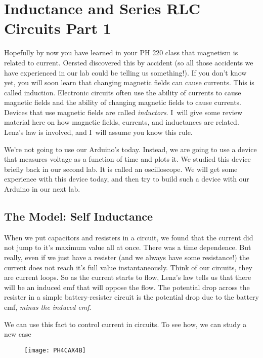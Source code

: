 \chapter{Inductance and Series RLC Circuits Part 1}
Hopefully by now you have learned in your PH 220 class that magnetism is related to current. Oersted discovered this by accident (so all those accidents we have experienced in our lab could be telling us something!). If you don't know yet, you will soon learn that changing magnetic fields can cause currents. This is called induction. Electronic circuits often use the ability of currents to cause magnetic fields and the ability of changing magnetic fields to cause currents. Devices that use magnetic fields are called \emph{inductors}. I\ will give some review material here on how magnetic fields, currents, and inductances are related. Lenz's law is involved, and I\ will assume you know this rule.

We're not going to use our Arduino's today. Instead, we are going to use a device that measures voltage as a function of time and plots it. We studied this device briefly back in our second lab. It is called an oscilloscope. We will get some experience with this device today, and then try to build such a device with our Arduino in our next lab.

\section{The Model: Self Inductance}

When we put capacitors and resisters in a circuit, we found that the current did not jump to it's maximum value all at once. There was a time dependence. But really, even if we just have a resister (and we always have some resistance!) the current does not reach it's full value instantaneously. Think of our circuits, they are current loops. So as the current starts to flow, Lenz's law tells us that there will be an induced emf that will oppose the flow. The potential drop across the resister in a simple battery-resister circuit is the potential drop due to the battery emf, \emph{minus the induced emf}.

We can use this fact to control current in circuits. To see how, we can study a new case

\begin{figure}[h!]
	\centering
	\texttt{[image: PH4CAX4B]}
\end{figure}

